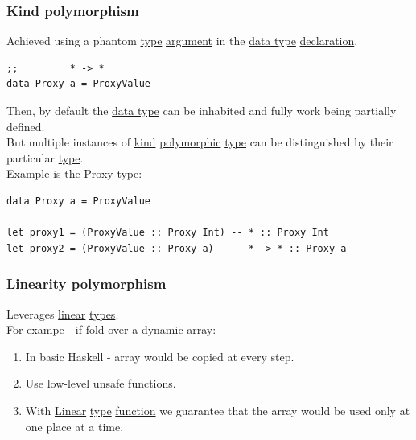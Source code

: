 \documentclass[11pt]{article}
\begin{document}
\subsubsection{\label{orgd8fb5bd}Kind polymorphism}
\label{sec:org236cc23}
Achieved using a phantom \hyperref[org4fbaeb8]{type} \hyperref[orgf66a5f7]{argument} in the \hyperref[org965cde3]{data type} \hyperref[org56ef1b9]{declaration}.\\
\begin{verbatim}
;;         * -> *
data Proxy a = ProxyValue
\end{verbatim}
Then, by default the \hyperref[org965cde3]{data type} can be inhabited and fully work being partially defined.\\
But multiple instances of \hyperref[org19ec4cb]{kind} \hyperref[org84d7fee]{polymorphic} \hyperref[org4fbaeb8]{type} can be distinguished by their particular \hyperref[org4fbaeb8]{type}.\\

Example is the \hyperref[org33659fe]{Proxy type}:\\
\begin{verbatim}
data Proxy a = ProxyValue

let proxy1 = (ProxyValue :: Proxy Int) -- * :: Proxy Int
let proxy2 = (ProxyValue :: Proxy a)   -- * -> * :: Proxy a
\end{verbatim}

\subsubsection{\label{org07521d0}Linearity polymorphism}
\label{sec:orgd505649}
Leverages \hyperref[orgb55e183]{linear} \hyperref[org3927fd9]{types}.\\
For exampe - if \hyperref[orgebf2b48]{fold} over a dynamic array:\\
\begin{enumerate}
\item In basic Haskell - array would be copied at every step.\\
\item Use low-level \hyperref[org76b942a]{unsafe} \hyperref[org66c5288]{functions}.\\
\item With \hyperref[orgb55e183]{Linear} \hyperref[org4fbaeb8]{type} \hyperref[orgeb5cddb]{function} we guarantee that the array would be used only at one place at a time.\\
\end{enumerate}
\end{document}
